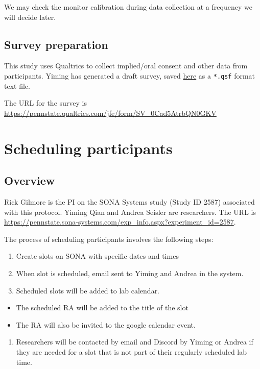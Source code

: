 \documentclass[]{article}
\providecommand{\tightlist}{%
  \setlength{\itemsep}{0pt}\setlength{\parskip}{0pt}}
\begin{document}
We may check the monitor calibration during data collection at a
frequency we will decide later.

\subsection{Survey preparation}\label{survey-preparation}

This study uses Qualtrics to collect implied/oral consent and other data
from participants. Yiming has generated a draft survey, saved
\href{qualtrics_survey.qsf}{here} as a \texttt{*.qsf} format text file.

The URL for the survey is
\url{https://pennstate.qualtrics.com/jfe/form/SV_0Cad5AtrbQN0GKV}

\section{Scheduling participants}\label{scheduling-participants}

\subsection{Overview}\label{overview}

Rick Gilmore is the PI on the SONA Systems study (Study ID 2587)
associated with this protocol. Yiming Qian and Andrea Seisler are
researchers. The URL is
\url{https://pennstate.sona-systems.com/exp_info.aspx?experiment_id=2587}.

The process of scheduling participants involves the following steps:

\begin{enumerate}
\def\labelenumi{\arabic{enumi}.}
\tightlist
\item
  Create slots on SONA with specific dates and times
\item
  When slot is scheduled, email sent to Yiming and Andrea in the system.
\item
  Scheduled slots will be added to lab calendar.
\end{enumerate}

\begin{itemize}
\tightlist
\item
  The scheduled RA will be added to the title of the slot
\item
  The RA will also be invited to the google calendar event.
\end{itemize}

\begin{enumerate}
\def\labelenumi{\arabic{enumi}.}
\setcounter{enumi}{3}
\tightlist
\item
  Researchers will be contacted by email and Discord by Yiming or Andrea
  if they are needed for a slot that is not part of their regularly
  scheduled lab time.
\end{enumerate}
\end{document}
